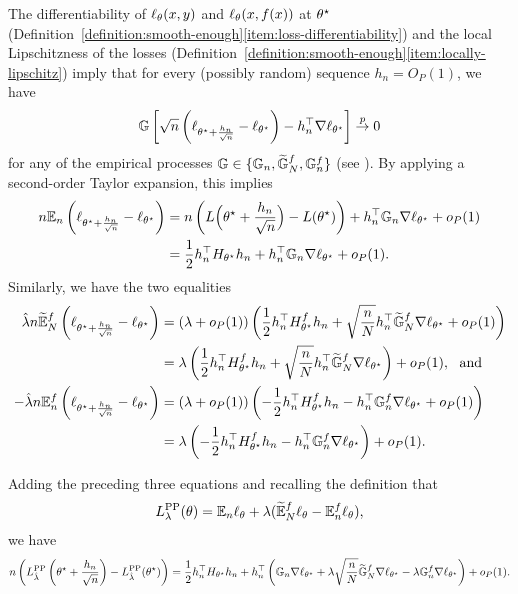 The differentiability of $\ell_\theta(x,y)$ and
$\ell_{\theta}(x, f(x))$ at $\theta^\star$ (Definition~\ref{definition:smooth-enough}\ref{item:loss-differentiability}) and the local Lipschitzness of the losses
(Definition~\ref{definition:smooth-enough}\ref{item:locally-lipschitz})
imply that
for every (possibly random) sequence $h_n = O_P(1)$, we have
\begin{equation*}
  \mathbb{G}\left[\sqrt{n} \left(\ell_{\theta^\star + \frac{h_n}{\sqrt{n}}} - \ell_{\theta^\star} \right) - h_n^\top \nabla \ell_{\theta^\star} \right]
  \stackrel{p}{\rightarrow} 0
\end{equation*}
for any of the empirical processes $\mathbb{G}\in \{\mathbb{G}_n, \widetilde {\mathbb{G}}_N^f,
\mathbb{G}_n^f \}$ (see \cite[Lemma 19.31]{VanDerVaart98}).  By applying a second-order Taylor expansion, this implies
\begin{align*}
  n \mathbb{E}_n\left(\ell_{\theta^\star + \frac{h_n}{\sqrt{n}}} - \ell_{\theta^\star}\right)
  & =
  n \left(L\Big(\theta^\star + \frac{h_n}{\sqrt{n}}\Big)
  - L(\theta^\star)\right)
  + h_n^\top \mathbb{G}_n \nabla \ell_{\theta^\star} + o_P(1) \\
  & = \frac{1}{2} h_n^\top H_{\theta^\star} h_n
  + h_n^\top \mathbb{G}_n \nabla\ell_{\theta^\star} + o_P(1).
\end{align*}
Similarly, we have the two equalities
\begin{align*}
  \hat\lambda n \widetilde {\mathbb{E}}_N^f\left(\ell_{\theta^\star + \frac{h_n}{\sqrt{n}}} - \ell_{\theta^\star}\right) &= (\lambda + o_P(1))\left(\frac{1}{2} h_n^\top H_{\theta^\star}^f h_n + \sqrt{\frac{n}{N}} h_n ^\top \widetilde {\mathbb{G}}_N^f \nabla \ell_{\theta^\star} + o_P(1)\right)\\
  & = \lambda \left(\frac{1}{2} h_n^\top H_{\theta^\star}^f h_n + \sqrt{\frac{n}{N}} h_n ^\top \widetilde {\mathbb{G}}_N^f \nabla \ell_{\theta^\star}\right) + o_P(1),
  ~~ \mbox{and} \\
 - \hat\lambda n \mathbb{E}_n^f\left(\ell_{\theta^\star + \frac{h_n}{\sqrt{n}}} - \ell_{\theta^\star}\right) &= (\lambda + o_P(1))\left( -\frac{1}{2} h_n^\top H_{\theta^\star}^f h_n - h_n ^\top \mathbb{G}_n^f  \nabla \ell_{\theta^\star} + o_P(1) \right)\\
 &= \lambda \left( -\frac{1}{2} h_n^\top H_{\theta^\star}^f h_n - h_n ^\top \mathbb{G}_n^f  \nabla \ell_{\theta^\star}\right) + o_P(1)  \label{eq:G_nf}.
\end{align*}

Adding the preceding three equations and recalling the definition
that 
\[L^{\mathrm{PP}}_\lambda(\theta) = \mathbb{E}_n \ell_\theta
+ \lambda (\widetilde{\mathbb{E}}_N^f \ell_\theta - \mathbb{E}_n^f \ell_\theta),\]
we have
\begin{equation*}
  n \left(L^{\mathrm{PP}}_{\hat\lambda}\left(\theta^\star + \frac{h_n}{\sqrt{n}}\right)
  - L^{\mathrm{PP}}_{\hat\lambda}(\theta^\star)\right)
  = \frac{1}{2} h_n^\top H_{\theta^\star} h_n
  + h_n^\top \left(\mathbb{G}_n \nabla\ell_{\theta^\star}
  + \lambda\sqrt{\frac{n}{N}} \widetilde {\mathbb{G}}_N^f \nabla\ell_{\theta^\star}
  - \lambda \mathbb{G}_n^f \nabla\ell_{\theta^\star}\right) + o_P(1).
\end{equation*}

